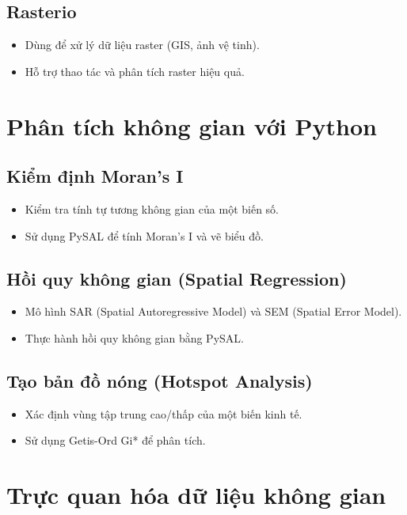 \subsection{Rasterio}
\begin{itemize}
    \item Dùng để xử lý dữ liệu raster (GIS, ảnh vệ tinh).
    \item Hỗ trợ thao tác và phân tích raster hiệu quả.
\end{itemize}

\section{Phân tích không gian với Python}
\subsection{Kiểm định Moran's I}
\begin{itemize}
    \item Kiểm tra tính tự tương không gian của một biến số.
    \item Sử dụng PySAL để tính Moran's I và vẽ biểu đồ.
\end{itemize}

\subsection{Hồi quy không gian (Spatial Regression)}
\begin{itemize}
    \item Mô hình SAR (Spatial Autoregressive Model) và SEM (Spatial Error Model).
    \item Thực hành hồi quy không gian bằng PySAL.
\end{itemize}

\subsection{Tạo bản đồ nóng (Hotspot Analysis)}
\begin{itemize}
    \item Xác định vùng tập trung cao/thấp của một biến kinh tế.
    \item Sử dụng Getis-Ord Gi* để phân tích.
\end{itemize}

\section{Trực quan hóa dữ liệu không gian}
